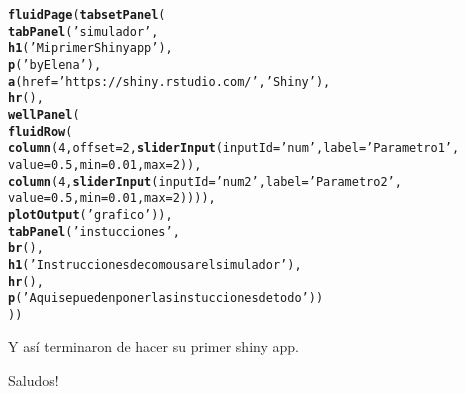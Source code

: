 \documentclass[11pt, oneside]{article}\usepackage[]{graphicx}\usepackage[]{color}
\makeatletter
\newcommand{\hlnum}[1]{\textcolor[rgb]{0.686,0.059,0.569}{#1}}%
\newcommand{\hlstr}[1]{\textcolor[rgb]{0.192,0.494,0.8}{#1}}%
\newcommand{\hlstd}[1]{\textcolor[rgb]{0.345,0.345,0.345}{#1}}%
\newcommand{\hlkwc}[1]{\textcolor[rgb]{0.333,0.667,0.333}{#1}}%
\newcommand{\hlkwd}[1]{\textcolor[rgb]{0.737,0.353,0.396}{\textbf{#1}}}%
\newenvironment{kframe}{%
 \def\at@end@of@kframe{}%
 \ifinner\ifhmode%
  \def\at@end@of@kframe{\end{minipage}}%
  \begin{minipage}{\columnwidth}%
 \fi\fi%
 \def\FrameCommand##1{\hskip\@totalleftmargin \hskip-\fboxsep
 \colorbox{shadecolor}{##1}\hskip-\fboxsep
     \hskip-\linewidth \hskip-\@totalleftmargin \hskip\columnwidth}%
 \MakeFramed {\advance\hsize-\width
   \@totalleftmargin\z@ \linewidth\hsize
   \@setminipage}}%
 {\par\unskip\endMakeFramed%
 \at@end@of@kframe}
\newenvironment{knitrout}{}{} %
\makeatother
\begin{document}
\begin{knitrout}
\color{fgcolor}\begin{kframe}
\begin{alltt}
\hlkwd{fluidPage}\hlstd{(}\hlkwd{tabsetPanel}\hlstd{(}
          \hlkwd{tabPanel}\hlstd{(}\hlstr{'simulador'}\hlstd{,}
          \hlkwd{h1}\hlstd{(}\hlstr{'Mi primer Shiny app'}\hlstd{),}
          \hlkwd{p}\hlstd{(}\hlstr{'by Elena'}\hlstd{),}
          \hlkwd{a}\hlstd{(}\hlkwc{href}\hlstd{=}\hlstr{'https://shiny.rstudio.com/'}\hlstd{,}\hlstr{'Shiny'}\hlstd{),}
          \hlkwd{hr}\hlstd{(),}
          \hlkwd{wellPanel}\hlstd{(}
          \hlkwd{fluidRow}\hlstd{(}
           \hlkwd{column}\hlstd{(}\hlnum{4}\hlstd{,}\hlkwc{offset}\hlstd{=}\hlnum{2}\hlstd{,}\hlkwd{sliderInput}\hlstd{(}\hlkwc{inputId}\hlstd{=} \hlstr{'num'}\hlstd{,} \hlkwc{label}\hlstd{=}\hlstr{'Parametro 1'}\hlstd{,}
                      \hlkwc{value}\hlstd{=}\hlnum{0.5}\hlstd{,} \hlkwc{min}\hlstd{=}\hlnum{0.01}\hlstd{,} \hlkwc{max}\hlstd{=}\hlnum{2}\hlstd{)),}
           \hlkwd{column}\hlstd{(}\hlnum{4}\hlstd{,}\hlkwd{sliderInput}\hlstd{(}\hlkwc{inputId}\hlstd{=} \hlstr{'num2'}\hlstd{,} \hlkwc{label}\hlstd{=}\hlstr{'Parametro 2'}\hlstd{,}
                      \hlkwc{value}\hlstd{=}\hlnum{0.5}\hlstd{,} \hlkwc{min}\hlstd{=}\hlnum{0.01}\hlstd{,}  \hlkwc{max}\hlstd{=}\hlnum{2}\hlstd{)))),}
          \hlkwd{plotOutput}\hlstd{(}\hlstr{'grafico'}\hlstd{)),}
          \hlkwd{tabPanel}\hlstd{(}\hlstr{'instucciones'}\hlstd{,}
                   \hlkwd{br}\hlstd{(),}
                   \hlkwd{h1}\hlstd{(}\hlstr{'Instrucciones de como usar el simulador'}\hlstd{),}
                   \hlkwd{hr}\hlstd{(),}
                   \hlkwd{p}\hlstd{(}\hlstr{'Aqui se pueden poner las instucciones de todo'}\hlstd{))}
\hlstd{))}
\end{alltt}
\end{kframe}
\end{knitrout}


Y así terminaron de hacer su primer shiny app.

Saludos!
\end{document}
